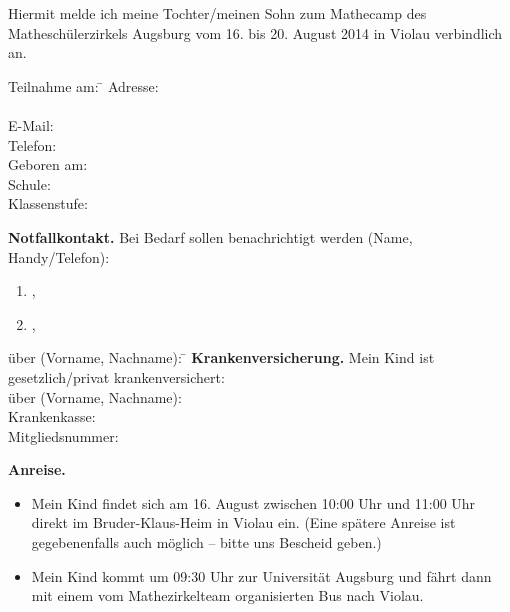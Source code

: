 \documentclass{zettel}
\begin{document}
\renewcommand{\betreff}{Anmeldung zum Mathecamp des Matheschülerzirkels Augsburg}


Hiermit melde ich meine Tochter/meinen Sohn \freistLaenger{} zum Mathecamp des
Matheschülerzirkels Augsburg vom 16. bis 20. August 2014 in
Violau verbindlich an.

\vspace{-0.5em}
\doublespacing
\begin{tabbing}
  Teilnahme am: \= \kill
  Adresse: \> \freistLang \\
  \> \freistLang \\
  E-Mail: \> \freistLang \\
  Telefon: \> \freistLang \\
  Geboren am: \> \freistLang \\
  Schule: \> \freistLang \\
  Klassenstufe: \> \freistKurz
\end{tabbing}

\begin{shaded}
\textbf{Notfallkontakt.} Bei Bedarf sollen benachrichtigt werden (Name, Handy/Telefon):
\begin{enumerate}
\item \freist{7cm},\quad\freist{7cm}
\item \freist{7cm},\quad\freist{7cm}
\end{enumerate}
\end{shaded}

\begin{shaded}
\vspace{-2em}
\begin{tabbing}
  über (Vorname, Nachname): \= \kill
  \textbf{Krankenversicherung.} Mein Kind ist gesetzlich/privat krankenversichert: \\
  über (Vorname, Nachname): \> \freistLang \\
  Krankenkasse: \> \freistLang \\
  Mitgliedsnummer: \> \freistLang
\end{tabbing}
\vspace{-1em}
\end{shaded}

\newpage
\vspace*{-1cm}
\singlespacing

\begin{shaded}
\textbf{Anreise.}
\begin{itemize}
\item[\checkbox] Mein Kind findet sich am 16. August zwischen 10:00 Uhr und 11:00
Uhr direkt im Bruder-Klaus-Heim in Violau ein. (Eine spätere Anreise ist
gegebenenfalls auch möglich -- bitte uns Bescheid geben.)
\item[\checkbox] Mein Kind kommt um 09:30 Uhr zur Universität
Augsburg und fährt dann mit einem vom Mathezirkelteam organisierten Bus nach Violau.
\end{itemize}
\end{shaded}
\end{document}
